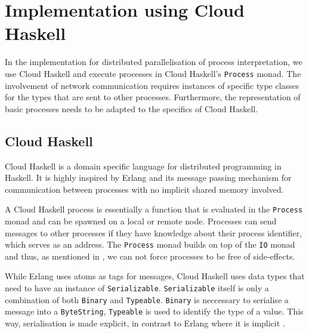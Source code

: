 \clearpage

\section{Implementation using Cloud Haskell}
\label{chp:distributed}
In the implementation for distributed parallelisation of process interpretation, we use \textsf{Cloud Haskell} and execute processes in \textsf{Cloud Haskell}'s \texttt{Process} monad. The involvement of network communication requires instances of specific type classes for the types that are sent to other processes. Furthermore, the representation of basic processes needs to be adapted to the specifics of \textsf{Cloud Haskell}. 

\subsection{Cloud Haskell}
\label{chp:cloud_haskell}
\textsf{Cloud Haskell} \cite{Epstein:2011:THC:2034675.2034690} is a domain specific language for distributed programming in Haskell. It is highly inspired by Erlang and its message passing mechanism for communication between processes with no implicit shared memory involved.

A \textsf{Cloud Haskell} process is essentially a function that is evaluated in the \texttt{Process} monad and can be spawned on a local or remote node. Processes can send messages to other processes if they have knowledge about their process identifier, which serves as an address. The \texttt{Process} monad builds on top of the \texttt{IO} monad and thus, as mentioned in , we can not force processes to be free of side-effects.

While Erlang uses atoms as tags for messages, \textsf{Cloud Haskell} uses data types that need to have an instance of \texttt{Serializable}. \texttt{Serializable} itself is only a combination of both \texttt{Binary} and \texttt{Typeable}. \texttt{Binary} is neccessary to serialise a message into a \texttt{ByteString}, \texttt{Typeable} is used to identify the type of a value. This way, serialisation is made explicit, in contrast to Erlang where it is implicit \cite{Epstein:2011:THC:2034675.2034690}.

